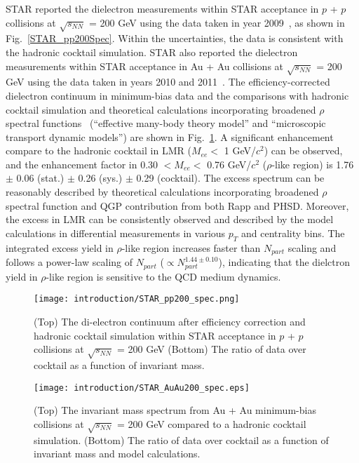 STAR reported the dielectron measurements within STAR acceptance in $p$ + $p$ collisions at $\sqrt{s_{NN}}$ = 200 GeV using the data taken in year 2009~\cite{STAR:dielectron0}, as shown in Fig.~\ref{STAR_pp200Spec}. Within the uncertainties, the data is consistent with the hadronic cocktail simulation. STAR also reported the dielectron measurements within STAR acceptance in Au + Au collisions at $\sqrt{s_{NN}}$ = 200 GeV using the data taken in years 2010 and 2011~\cite{STAR:dielectron1:PRL,STAR:dielectron1}. The efficiency-corrected dielectron continuum in minimum-bias data and the comparisons with hadronic cocktail simulation and theoretical calculations incorporating broadened $\rho$ spectral functions~\cite{broaden0,broaden1,broaden4,broaden:PHSD0,broaden:PHSD1} (``effective many-body theory model'' and ``microscopic transport dynamic models'') are shown in Fig.~\ref{STAR_AuAu200Spec}. A significant enhancement compare to the hadronic cocktail in LMR ($M_{ee}<$ 1 GeV/$c^{2}$) can be observed, and the enhancement factor in 0.30 $<M_{ee}<$ 0.76 GeV/$c^{2}$ ($\rho$-like region) is 1.76 $\pm$ 0.06 (stat.) $\pm$ 0.26 (sys.) $\pm$ 0.29 (cocktail). The excess spectrum can be reasonably described by theoretical calculations incorporating broadened $\rho$ spectral function and QGP contribution from both Rapp and PHSD. Moreover, the excess in LMR can be consistently observed and described by the model calculations in differential measurements in various $p_{T}$ and centrality bins. The integrated excess yield in $\rho$-like region increases faster than $N_{part}$ scaling and follows a power-law scaling of $N_{part}$ ($\propto$$N_{part}^{1.44 \pm 0.10}$), indicating that the dielctron yield in $\rho$-like region is sensitive to the QCD medium dynamics. 

\begin{figure}[htbp]
\begin{minipage}[htbp]{0.50\linewidth}
\centering
\texttt{[image: introduction/STAR\_pp200\_spec.png]}
\caption{(Top) The di-electron continuum after efficiency correction and hadronic cocktail simulation within STAR acceptance in $p$ + $p$ collisions at $\sqrt{s_{NN}}$ = 200 GeV (Bottom) The ratio of data over cocktail as a function of invariant mass. \label{STAR_pp200Spec}}
\end{minipage}
\hfill
\begin{minipage}[htbp]{0.48\linewidth}
\centering
\texttt{[image: introduction/STAR\_AuAu200\_spec.eps]} 
\caption{(Top) The invariant mass spectrum from Au + Au minimum-bias collisions at $\sqrt{s_{NN}}$ = 200 GeV compared to a hadronic cocktail simulation. (Bottom) The ratio of data over cocktail as a function of invariant mass and model calculations.\label{STAR_AuAu200Spec}}
\end{minipage}
\end{figure}

